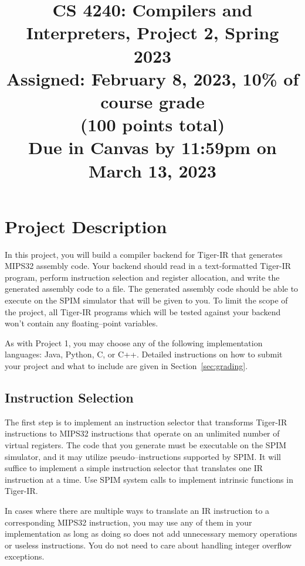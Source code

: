 \documentclass[12pt]{article}
\title{CS 4240: Compilers and Interpreters, Project 2, Spring 2023\\
\Large
Assigned: February 8, 2023, 10\% of course grade\\
(100 points total)\\
{Due in Canvas by 11:59pm on March 13, 2023}\\
}
\author{}
\date{}
\begin{document}
\maketitle
\thispagestyle{fancy}

\section{Project Description}

In this project, you will build a compiler backend for Tiger-IR that generates MIPS32 assembly code. Your backend should read in a text-formatted Tiger-IR program, perform instruction selection and register allocation, and write the generated assembly code to a file. The generated assembly code should be able to execute on the SPIM simulator that will be given to you. To limit the scope of the project, all Tiger-IR programs which will be tested against your backend won't contain any floating--point variables.

As with Project 1, you may choose any of the following implementation languages: Java, Python, C, or C++. Detailed instructions on how to submit your project and what to include are given in Section~\ref{sec:grading}.

\subsection{Instruction Selection}\label{sec:instruction-selection}

The first step is to implement an instruction selector that transforms Tiger-IR instructions to MIPS32 instructions that operate on an unlimited number of virtual registers. The code that you generate must be executable on the SPIM simulator, and it may utilize pseudo--instructions supported by SPIM. It will suffice to implement a simple instruction selector that translates one IR instruction at a time. Use SPIM system calls to implement intrinsic functions in Tiger-IR.

In cases where there are multiple ways to translate an IR instruction to a corresponding MIPS32 instruction, you may use any of them in your implementation as long as doing so does not add unnecessary memory operations or useless instructions. You do not need to care about handling integer overflow exceptions.
\end{document}

